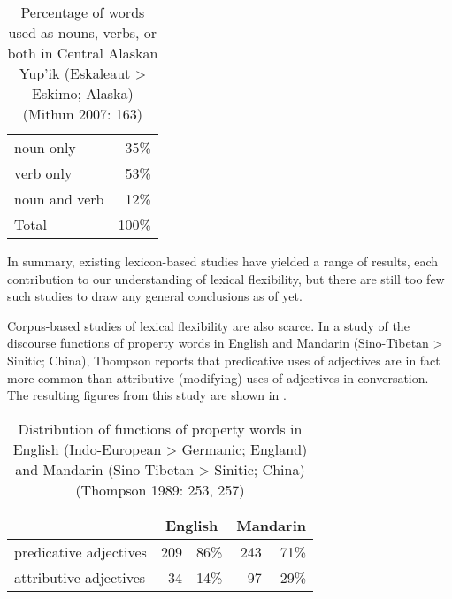 \begin{table}[h]
  \centering
  \caption[Percentage of words used as nouns, verbs, or both in Central Alaskan Yup'ik (Eskaleaut > Eskimo; Alaska)]{Percentage of words used as nouns, verbs, or both in Central Alaskan Yup'ik (Eskaleaut > Eskimo; Alaska) (Mithun 2007: 163)}
  \label{tab:Mithun-2017}
  \begin{tabular}{ l r }
    \toprule
    noun only     &  35\% \\
    verb only     &  53\% \\
    noun and verb &  12\% \\
    \midrule
    Total         & 100\% \\
    \bottomrule
  \end{tabular}
\end{table}


In summary, existing lexicon-based studies have yielded a range of results, each contribution to our understanding of lexical flexibility, but there are still too few such studies to draw any general conclusions as of yet.

Corpus-based studies of lexical flexibility are also scarce. In a study of the discourse functions of property words in English and Mandarin (Sino-Tibetan > Sinitic; China), Thompson  reports that predicative uses of adjectives are in fact more common than attributive (modifying) uses of adjectives in conversation. The resulting figures from this study are shown in .

\begin{table}[h]
  \centering
  \caption[Distribution of functions of property words in English (Indo-European > Germanic; England) and Mandarin (Sino-Tibetan > Sinitic; China)]{Distribution of functions of property words in English (Indo-European > Germanic; England) and Mandarin (Sino-Tibetan > Sinitic; China) (Thompson 1989: 253, 257)}
  \label{tab:Thompson-1989}
  \begin{tabular}{ l r r r r }
    \toprule
                             & \multicolumn{2}{c}{English} & \multicolumn{2}{c}{Mandarin} \\
    \midrule
      predicative adjectives & 209 & 86\%                  & 243 & 71\% \\
      attributive adjectives &  34 & 14\%                  &  97 & 29\% \\
    \bottomrule
  \end{tabular}
\end{table}

